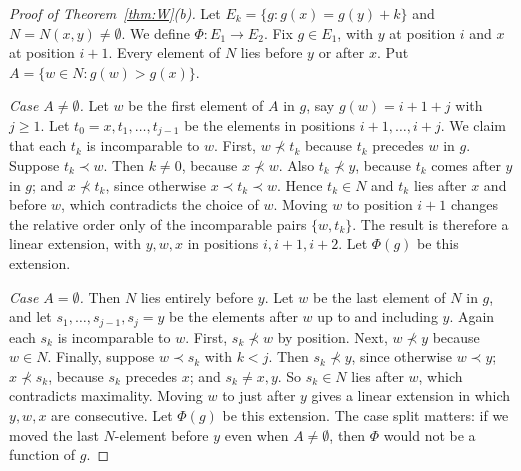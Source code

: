 \documentclass[10pt]{amsart}
\theoremstyle{definition}
\theoremstyle{remark}
\begin{document}
\begin{proof}[Proof of Theorem~\ref{thm:W}(b)]
Let $E_k=\{g: g(x)=g(y)+k\}$ and $N=N(x,y)\ne\emptyset$. We define $\Phi:E_1\to E_2$.
Fix $g\in E_1$, with $y$ at position $i$ and $x$ at position $i+1$.
Every element of $N$ lies before $y$ or after $x$.
Put $A=\{w\in N: g(w)>g(x)\}$.

\emph{Case $A\ne\emptyset$.} Let $w$ be the first element of $A$ in $g$, say $g(w)=i+1+j$ with $j\ge1$.
Let $t_0=x,t_1,\dots,t_{j-1}$ be the elements in positions $i+1,\dots,i+j$.
We claim that each $t_k$ is incomparable to $w$.
First, $w\not\prec t_k$ because $t_k$ precedes $w$ in $g$.
Suppose $t_k\prec w$. Then $k\ne0$, because $x\not\prec w$.
Also $t_k\not\prec y$, because $t_k$ comes after $y$ in $g$; and $x\not\prec t_k$, since otherwise $x\prec t_k\prec w$.
Hence $t_k\in N$ and $t_k$ lies after $x$ and before $w$, which contradicts the choice of $w$.
Moving $w$ to position $i+1$ changes the relative order only of the incomparable pairs $\{w,t_k\}$.
The result is therefore a linear extension, with $y,w,x$ in positions $i,i+1,i+2$. Let $\Phi(g)$ be this extension.

\emph{Case $A=\emptyset$.} Then $N$ lies entirely before $y$. Let $w$ be the last element of $N$ in $g$, and let $s_1,\dots,s_{j-1},s_j=y$ be the elements after $w$ up to and including $y$.
Again each $s_k$ is incomparable to $w$.
First, $s_k\not\prec w$ by position.
Next, $w\not\prec y$ because $w\in N$.
Finally, suppose $w\prec s_k$ with $k<j$. Then $s_k\not\prec y$, since otherwise $w\prec y$; $x\not\prec s_k$, because $s_k$ precedes $x$; and $s_k\ne x,y$.
So $s_k\in N$ lies after $w$, which contradicts maximality.
Moving $w$ to just after $y$ gives a linear extension in which $y,w,x$ are consecutive. Let $\Phi(g)$ be this extension.
The case split matters: if we moved the last $N$-element before $y$ even when $A\ne\emptyset$, then $\Phi$ would not be a function of $g$.


\end{proof}
\end{document}
